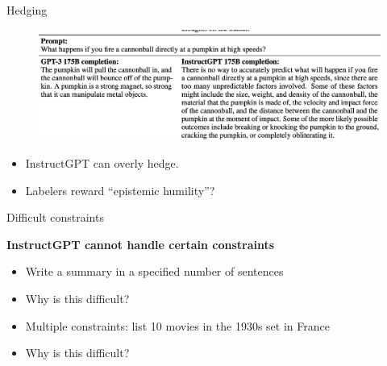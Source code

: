\begin{vbframe}{Hedging}

\vfill

\begin{figure}
\centering
\includegraphics[width = 12cm]{figure/hedging.png}
\end{figure}

\begin{itemize}
	\item InstructGPT can overly hedge.
\item Labelers reward ``epistemic humility''?
\end{itemize}

\vfill

\end{vbframe}

\begin{vbframe}{Difficult constraints}

\vfill

\textbf{InstructGPT cannot handle certain constraints}

	\begin{itemize}
		\item Write a summary in a specified number
		of sentences
                \item \ques Why is this difficult?
                \item Multiple constraints: list 10 movies
		in the 1930s set in France
                \item \ques Why is this difficult?
	\end{itemize}

\vfill

\end{vbframe}

